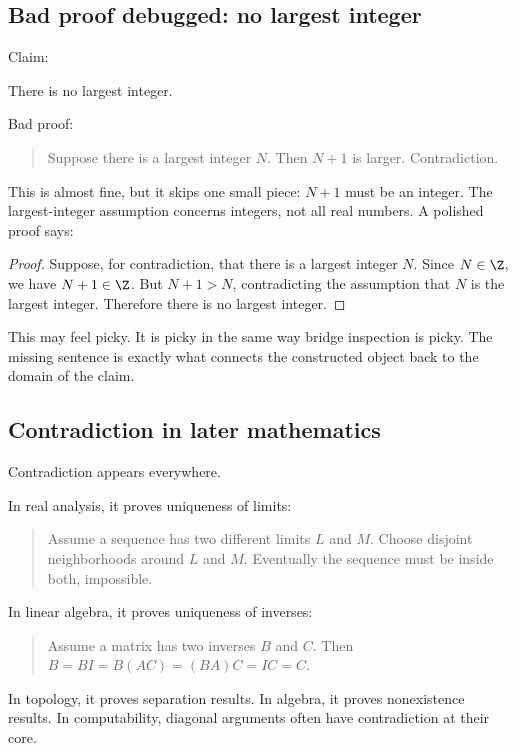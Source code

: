 \subsection{Bad proof debugged: no largest integer}

Claim:

\begin{theorem}
There is no largest integer.
\end{theorem}

Bad proof:

\begin{quote}
Suppose there is a largest integer $N$. Then $N+1$ is larger. Contradiction.
\end{quote}

This is almost fine, but it skips one small piece: $N+1$ must be an integer. The largest-integer assumption concerns integers, not all real numbers. A polished proof says:

\begin{proof}
Suppose, for contradiction, that there is a largest integer $N$. Since $N\in\Z$, we have $N+1\in\Z$. But $N+1>N$, contradicting the assumption that $N$ is the largest integer. Therefore there is no largest integer.
\end{proof}

This may feel picky. It is picky in the same way bridge inspection is picky. The missing sentence is exactly what connects the constructed object back to the domain of the claim.

\subsection{Contradiction in later mathematics}

Contradiction appears everywhere.

In real analysis, it proves uniqueness of limits:

\begin{quote}
Assume a sequence has two different limits $L$ and $M$. Choose disjoint neighborhoods around $L$ and $M$. Eventually the sequence must be inside both, impossible.
\end{quote}

In linear algebra, it proves uniqueness of inverses:

\begin{quote}
Assume a matrix has two inverses $B$ and $C$. Then $B=BI=B(AC)=(BA)C=IC=C$.
\end{quote}

In topology, it proves separation results. In algebra, it proves nonexistence results. In computability, diagonal arguments often have contradiction at their core.

